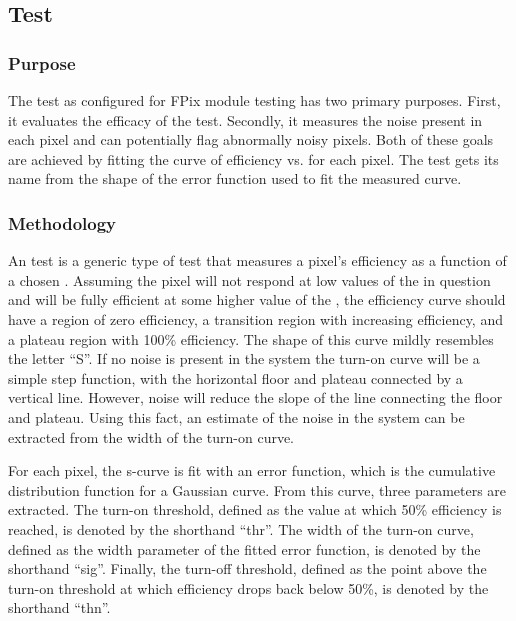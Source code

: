 
\newpage

\subsection{\scurves Test}
\label{ss:scurves}

\subsubsection{Purpose}

The \scurves test as configured for FPix module testing has two primary purposes.
First, it evaluates the efficacy of the \trimming test.
Secondly, it measures the noise present in each pixel and can potentially flag abnormally noisy pixels.
Both of these goals are achieved by fitting the curve of efficiency vs. \vcal for each pixel.
The test gets its name from the shape of the error function used to fit the measured curve.

\subsubsection{Methodology}

An \scurves test is a generic type of test that measures a pixel's efficiency as a function of a chosen \dac.
Assuming the pixel will not respond at low values of the \dac in question and will be fully efficient at some higher value of the \dac,
the efficiency curve should have a region of zero efficiency, 
a transition region with increasing efficiency, and a plateau region with 100\% efficiency.
The shape of this curve mildly resembles the letter ``S''.
If no noise is present in the system the turn-on curve will be a simple step function, 
with the horizontal floor and plateau connected by a vertical line.
However, noise will reduce the slope of the line connecting the floor and plateau.
Using this fact, an estimate of the noise in the system can be extracted from the width of the turn-on curve.

For each pixel, the s-curve is fit with an error function, which is the cumulative distribution function for a Gaussian curve.
From this curve, three parameters are extracted.
The turn-on threshold, defined as the \dac value at which 50\% efficiency is reached, is denoted by the shorthand ``thr''.
The width of the turn-on curve, defined as the width parameter of the fitted error function, is denoted by the shorthand ``sig''.
Finally, the turn-off threshold, 
defined as the point above the turn-on threshold at which efficiency drops back below 50\%, is denoted by the shorthand ``thn''.

